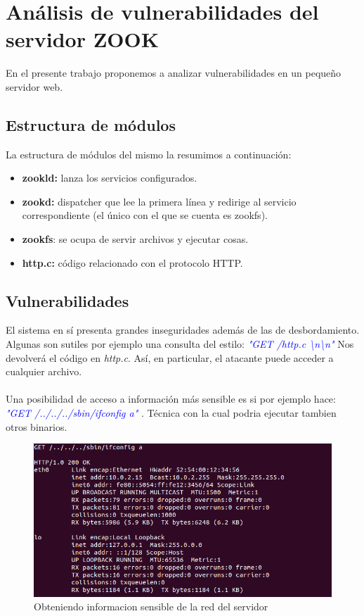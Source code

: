 \documentclass[12pt]{article}
\begin{document}
\section{Análisis de vulnerabilidades del servidor ZOOK}
En el presente trabajo proponemos a analizar vulnerabilidades en un pequeño servidor web.\\ 

\subsection{Estructura de módulos}
La estructura de módulos del mismo la resumimos a continuación:
\begin{itemize}
\item \textbf{zookld:} lanza los servicios configurados.
\item \textbf{zookd:} dispatcher que lee la primera línea y redirige al servicio correspondiente (el único con el que se cuenta es zookfs).
\item \textbf{zookfs}: se ocupa de servir archivos y ejecutar cosas.
\item \textbf{http.c:} código relacionado con el protocolo HTTP.
\end{itemize}

\subsection{Vulnerabilidades}
El sistema en sí presenta grandes inseguridades además de las de desbordamiento. Algunas son sutiles por ejemplo una consulta del estilo: \textcolor{blue}{\textit{ "GET /http.c \textbackslash n\textbackslash n" }} Nos devolverá el código en \textit{http.c}. Así, en particular, el atacante puede acceder a cualquier archivo. \\ \\
Una posibilidad de acceso a información más sensible es si por ejemplo hace: \textcolor{blue}{\textit{ "GET /../../../sbin/ifconfig a" }}. Técnica con la cual podria ejecutar tambien otros binarios.

\begin{figure}[htp]
\centering
\includegraphics[scale=0.6]{./imagenes/ifconfig.png}
\caption{Obteniendo informacion sensible de la red del servidor}
\end{figure}
\end{document}
